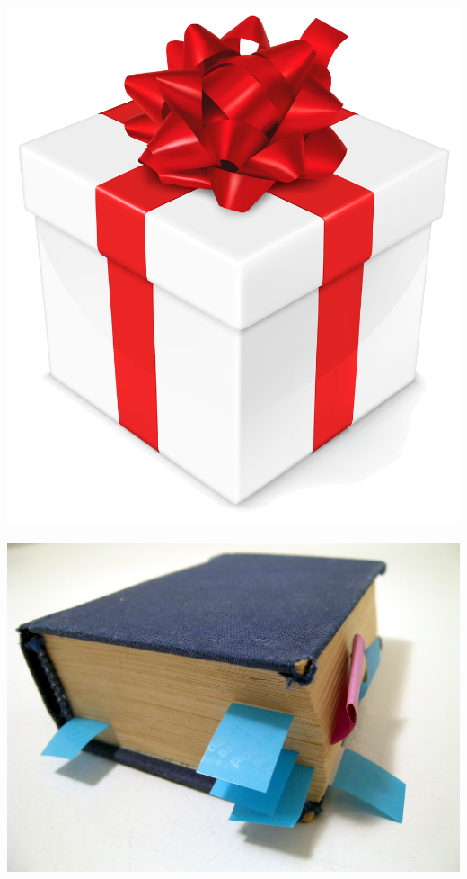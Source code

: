 \documentclass[14pt,mathserif]{beamer}
\begin{document}
\begin{frame}
\centering
\includegraphics[height=\paperheight]{gift} 
\end{frame}

\begin{frame}
\hspace*{-11.2mm}
\includegraphics[width=\paperwidth]{bookmark}
\end{frame}
\end{document}
